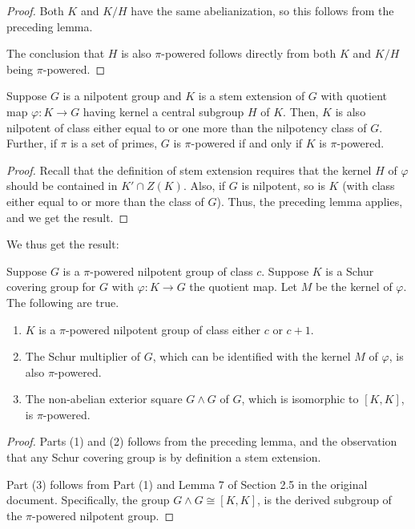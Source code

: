 \documentclass[10pt]{amsart}
\begin{document}
\begin{proof}
  Both $K$ and $K/H$ have the same abelianization, so this follows from
  the preceding lemma.

  The conclusion that $H$ is also $\pi$-powered follows directly from
  both $K$ and $K/H$ being $\pi$-powered.
\end{proof}

\begin{lemma}
  Suppose $G$ is a nilpotent group and $K$ is a stem extension of $G$
  with quotient map $\varphi:K \to G$ having kernel a central subgroup
  $H$ of $K$. Then, $K$ is also nilpotent of class either equal to or
  one more than the nilpotency class of $G$. Further, if $\pi$ is a
  set of primes, $G$ is $\pi$-powered if and only if $K$ is
  $\pi$-powered.
\end{lemma}

\begin{proof}
  Recall that the definition of stem extension requires that the
  kernel $H$ of $\varphi$ should be contained in $K' \cap Z(K)$. Also,
  if $G$ is nilpotent, so is $K$ (with class either equal to or more
  than the class of $G$). Thus, the preceding lemma applies, and we get
  the result.
\end{proof}

We thus get the result:

\begin{lemma}\label{schurcoverpipower}
  Suppose $G$ is a $\pi$-powered nilpotent group of class $c$. Suppose
  $K$ is a Schur covering group for $G$ with $\varphi:K \to G$ the
  quotient map. Let $M$ be the kernel of $\varphi$. The following are
  true.

  \begin{enumerate}
  \item $K$ is a $\pi$-powered nilpotent group of class either $c$ or
    $c + 1$.
  \item The Schur multiplier of $G$, which can be identified
    with the kernel $M$ of $\varphi$, is also $\pi$-powered.
  \item The non-abelian exterior square $G \wedge G$ of $G$, which is
    isomorphic to $[K,K]$, is $\pi$-powered.
  \end{enumerate}
\end{lemma}

\begin{proof}
  Parts (1) and (2) follows from the preceding lemma, and the observation that
  any Schur covering group is by definition a stem extension.

  Part (3) follows from Part (1) and Lemma 7 of Section 2.5 in the
  original document. Specifically, the group $G \wedge G \cong [K,K]$,
  is the derived subgroup of the $\pi$-powered nilpotent group.
\end{proof}
\end{document}
